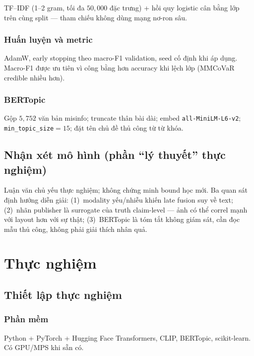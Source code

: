 \documentclass[12pt, a4paper]{report}
\begin{document}
TF--IDF (1--2 gram, tối đa $50{,}000$ đặc trưng) + hồi quy logistic cân bằng lớp trên cùng split --- tham chiếu không dùng mạng nơ-ron sâu.

\subsection{Huấn luyện và metric}

AdamW, early stopping theo macro-F1 validation, seed cố định khi áp dụng.
Macro-F1 được ưu tiên vì công bằng hơn accuracy khi lệch lớp (MMCoVaR credible nhiều hơn).

\subsection{BERTopic}

Gộp $5{,}752$ văn bản misinfo; truncate thân bài dài; embed \texttt{all-MiniLM-L6-v2}; \texttt{min\_topic\_size}$=15$; đặt tên chủ đề thủ công từ từ khóa.

\section{Nhận xét mô hình (phần ``lý thuyết'' thực nghiệm)}
\label{sec:theoretical-results}

Luận văn chủ yếu thực nghiệm; không chứng minh bound học mới.
Ba quan sát định hướng diễn giải:
(1)~modality yếu/nhiễu khiến late fusion suy về text;
(2)~nhãn publisher là surrogate của truth claim-level --- ảnh có thể correl mạnh với layout hơn với sự thật;
(3)~BERTopic là tóm tắt không giám sát, cần đọc mẫu thủ công, không phải giải thích nhân quả.

\chapter{Thực nghiệm}
\label{chap:experiments}

\section{Thiết lập thực nghiệm}
\label{sec:setup}

\subsection{Phần mềm}

Python + PyTorch + Hugging Face Transformers, CLIP, BERTopic, scikit-learn.
Có GPU/MPS khi sẵn có.
\end{document}
